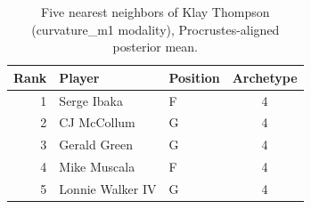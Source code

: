\begin{table}[htbp]
  \centering\small
  \begin{tabular}{rllc}
    \toprule
    Rank & Player & Position & Archetype \\
    \midrule
    1 & Serge Ibaka & F & 4 \\
    2 & CJ McCollum & G & 4 \\
    3 & Gerald Green & G & 4 \\
    4 & Mike Muscala & F & 4 \\
    5 & Lonnie Walker IV & G & 4 \\
    \bottomrule
  \end{tabular}
  \caption{Five nearest neighbors of Klay Thompson (curvature_m1 modality), Procrustes-aligned posterior mean.}
  \label{tab:Klay_Thompson_neighbors_curvature_m1}
\end{table}

